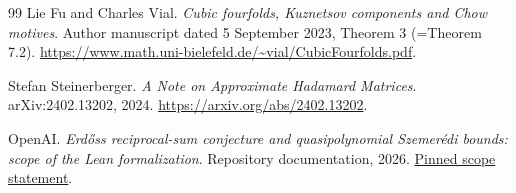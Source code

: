 \begin{thebibliography}{99}
 Lie Fu and Charles Vial. \emph{Cubic fourfolds, Kuznetsov components and Chow motives}. Author manuscript dated 5 September 2023, Theorem 3 (=Theorem 7.2). \url{https://www.math.uni-bielefeld.de/~vial/CubicFourfolds.pdf}.

 Stefan Steinerberger. \emph{A Note on Approximate Hadamard Matrices}. arXiv:2402.13202, 2024. \url{https://arxiv.org/abs/2402.13202}.

 OpenAI. \emph{Erd\H{o}s\textquotesingle s reciprocal-sum conjecture and quasipolynomial Szemer\'edi bounds: scope of the Lean formalization}. Repository documentation, 2026. \href{https://github.com/openai/math/blob/adc7f1241b42e322a6451854ab7e4b4c146bf78a/lean/docs/159.md}{Pinned scope statement}.

\end{thebibliography}
